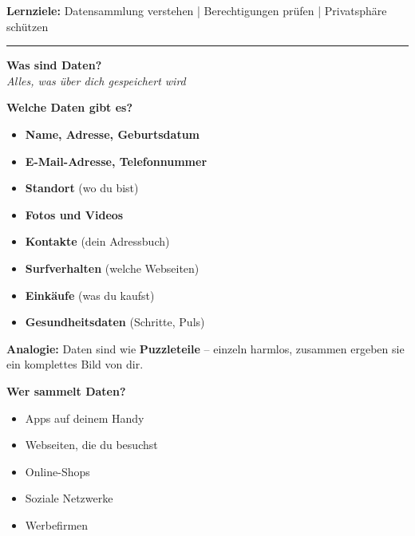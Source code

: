\documentclass[a4paper,landscape,8pt]{extarticle}
\begin{document}

 \hfill
{\footnotesize\textbf{Lernziele:} Datensammlung verstehen | Berechtigungen prüfen | Privatsphäre schützen}

\vspace{1mm}
\hrule
\vspace{1mm}

\begin{minipage}[t]{0.32\linewidth}
\begin{center}
\colorbox{privacyblue!10}{%
\begin{minipage}{0.95\linewidth}
\vspace{2mm}
\begin{center}
{\Large\bfseries\textcolor{privacyblue}{Was sind \glqq Daten\grqq{}?}}\\[1pt]
{\footnotesize\itshape Alles, was über dich gespeichert wird}
\end{center}
\vspace{2mm}
\end{minipage}%
}
\end{center}

\vspace{1mm}

\textbf{Welche Daten gibt es?}
\begin{itemize}
\item \textbf{Name, Adresse, Geburtsdatum}
\item \textbf{E-Mail-Adresse, Telefonnummer}
\item \textbf{Standort} (wo du bist)
\item \textbf{Fotos und Videos}
\item \textbf{Kontakte} (dein Adressbuch)
\item \textbf{Surfverhalten} (welche Webseiten)
\item \textbf{Einkäufe} (was du kaufst)
\item \textbf{Gesundheitsdaten} (Schritte, Puls)
\end{itemize}

\textbf{Analogie:} Daten sind wie \textbf{Puzzleteile} -- einzeln harmlos, zusammen ergeben sie ein komplettes Bild von dir.

\vspace{2mm}

\textbf{Wer sammelt Daten?}
\begin{itemize}
\item Apps auf deinem Handy
\item Webseiten, die du besuchst
\item Online-Shops
\item Soziale Netzwerke
\item Werbefirmen
\end{itemize}

\end{minipage}%
\end{document}
